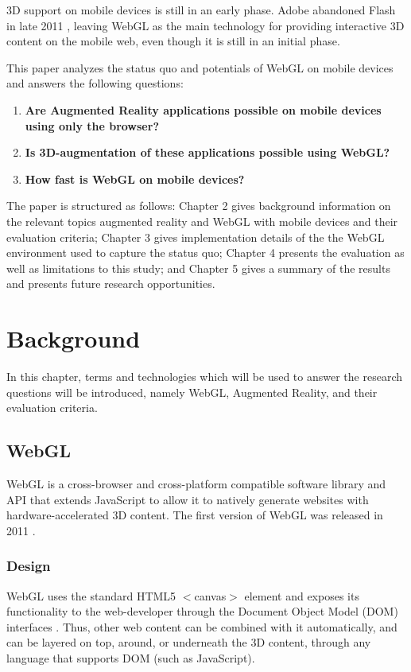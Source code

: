 \documentclass[12pt,journal,compsoc]{IEEEtran}
\begin{document}
3D support on mobile devices is still in an early phase. Adobe abandoned Flash in late 2011 \cite{Flash2011}, leaving WebGL as the main technology for providing interactive 3D content on the mobile web, even though it is still in an initial phase.

This paper analyzes the status quo and potentials of WebGL on mobile devices and answers the following questions:

\begin{enumerate}
	\item \textbf{Are Augmented Reality applications possible on mobile devices using only the browser?}
	\item \textbf{Is 3D-augmentation of these applications possible using WebGL?}
	\item \textbf{How fast is WebGL on mobile devices?}
\end{enumerate}

The paper is structured as follows: Chapter 2 gives background information on the relevant topics augmented reality and WebGL with mobile devices and their evaluation criteria; Chapter 3 gives implementation details of the the WebGL environment used to capture the status quo; Chapter 4 presents the evaluation as well as limitations to this study; and Chapter 5 gives a summary of the results and presents future research opportunities.



\section{Background}
In this chapter, terms and technologies which will be used to answer the research questions will be introduced, namely WebGL, Augmented Reality, and their evaluation criteria.

\subsection{WebGL}
WebGL is a cross-browser and cross-platform compatible software library and API that extends JavaScript to allow it to natively generate websites with hardware-accelerated 3D content. The first version of WebGL was released in 2011 \cite{Khronos2011}.

\subsubsection{Design}
WebGL uses the standard HTML5 $<$canvas$>$ element and exposes its functionality to the web-developer through the Document Object Model (DOM) interfaces \cite{Khronos2011}. Thus, other web content can be combined with it automatically, and can be layered on top, around, or underneath the 3D content, through any language that supports DOM (such as JavaScript).
\end{document}
